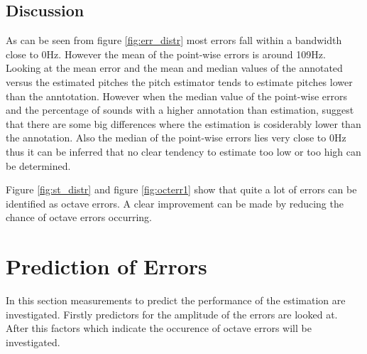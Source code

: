 \documentclass{proc}
\begin{document}
\subsection{Discussion}
As can be seen from figure \ref{fig:err_distr} most errors fall within a bandwidth close to 0Hz. However the mean of the point-wise errors is around 109Hz. Looking at the mean error and the mean and median values of the annotated versus the estimated pitches the pitch estimator tends to estimate pitches lower than the anntotation. However when the median value of the point-wise errors and the percentage of sounds with a higher annotation than estimation, suggest that there are some big differences where the estimation is cosiderably lower than the annotation. Also the median of the point-wise errors lies very close to 0Hz thus it can be inferred that no clear tendency to estimate too low or too high can be determined.

Figure \ref{fig:st_distr} and figure \ref{fig:octerr1} show that quite a lot of errors can be identified as octave errors. A clear improvement can be made by reducing the chance of octave errors occurring.

\section{Prediction of Errors}
In this section measurements to predict the performance of the estimation are investigated. Firstly predictors for the amplitude of the errors are looked at. After this factors which indicate the occurence of octave errors will be investigated.
\end{document}

